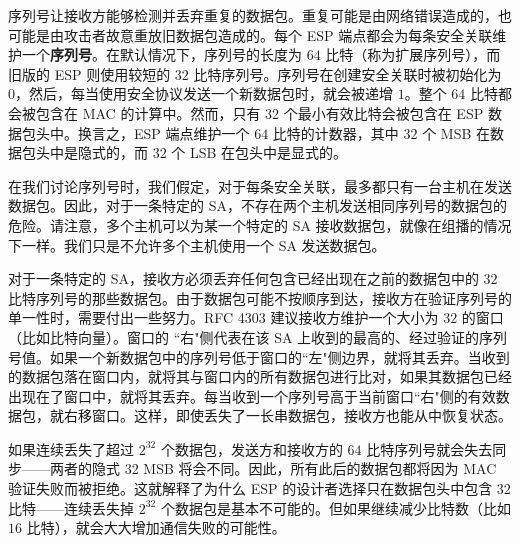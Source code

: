 \begin{snote}
序列号让接收方能够检测并丢弃重复的数据包。重复可能是由网络错误造成的，也可能是由攻击者故意重放旧数据包造成的。每个 ESP 端点都会为每条安全关联维护一个\textbf{序列号}。在默认情况下，序列号的长度为 $64$ 比特（称为扩展序列号），而旧版的 ESP 则使用较短的 $32$ 比特序列号。序列号在创建安全关联时被初始化为 $0$，然后，每当使用安全协议发送一个新数据包时，就会被递增 $1$。整个 $64$ 比特都会被包含在 MAC 的计算中。然而，只有 $32$ 个最小有效比特会被包含在 ESP 数据包头中。换言之，ESP 端点维护一个 $64$ 比特的计数器，其中 $32$ 个 MSB 在数据包头中是隐式的，而 $32$ 个 LSB 在包头中是显式的。

在我们讨论序列号时，我们假定，对于每条安全关联，最多都只有一台主机在发送数据包。因此，对于一条特定的 SA，不存在两个主机发送相同序列号的数据包的危险。请注意，多个主机可以为某一个特定的 SA 接收数据包，就像在组播的情况下一样。我们只是不允许多个主机使用一个 SA 发送数据包。

对于一条特定的 SA，接收方必须丢弃任何包含已经出现在之前的数据包中的 $32$ 比特序列号的那些数据包。由于数据包可能不按顺序到达，接收方在验证序列号的单一性时，需要付出一些努力。RFC 4303 建议接收方维护一个大小为 $32$ 的窗口（比如比特向量）。窗口的 ``右"侧代表在该 SA 上收到的最高的、经过验证的序列号值。如果一个新数据包中的序列号低于窗口的``左"侧边界，就将其丢弃。当收到的数据包落在窗口内，就将其与窗口内的所有数据包进行比对，如果其数据包已经出现在了窗口中，就将其丢弃。每当收到一个序列号高于当前窗口``右"侧的有效数据包，就右移窗口。这样，即使丢失了一长串数据包，接收方也能从中恢复状态。

如果连续丢失了超过 $2^{32}$ 个数据包，发送方和接收方的 $64$ 比特序列号就会失去同步——两者的隐式 $32$ MSB 将会不同。因此，所有此后的数据包都将因为 MAC 验证失败而被拒绝。这就解释了为什么 ESP 的设计者选择只在数据包头中包含 $32$ 比特——连续丢失掉 $2^{32}$ 个数据包是基本不可能的。但如果继续减少比特数（比如 $16$ 比特），就会大大增加通信失败的可能性。
\end{snote}

